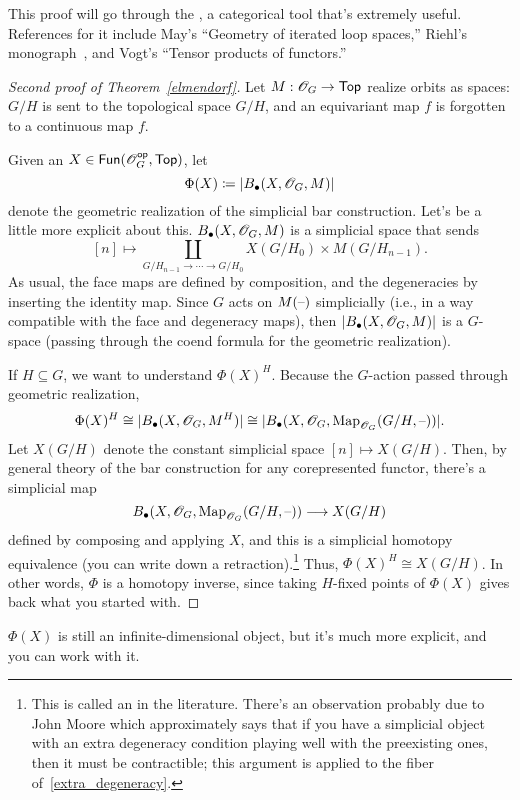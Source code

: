 This proof will go through the , a categorical tool that's extremely useful. References for
it include May's ``Geometry of iterated loop spaces,'' Riehl's monograph~\cite{RiehlCHT}, and Vogt's ``Tensor
products of functors.''
\begin{proof}[Second proof of Theorem~\ref{elmendorf}]
Let $M:\mathscr O_G\to\mathsf{Top}$ realize orbits as spaces: $G/H$ is sent to the topological space $G/H$, and an equivariant map
$f$ is forgotten to a continuous map $f$.

Given an $X\in\mathsf{Fun}(\mathscr O_G^{\mathsf{op}}, \mathsf{Top})$, let
\[\Phi(X) \coloneqq \lvert B_\bullet(X, \mathscr O_G, M)\rvert\]
denote the geometric realization of the simplicial bar construction. Let's be a little more explicit about this.
$B_\bullet(X, \mathscr O_G, M)$ is a simplicial space that sends
\[[n]\mapsto \coprod_{G/H_{n-1}\to\dotsb\to G/H_0} X(G/H_0)\times M(G/H_{n-1}).\]
As usual, the face maps are defined by composition, and the degeneracies by inserting the identity map. Since $G$
acts on $M(\text{--})$ simplicially (i.e., in a way compatible with the face and degeneracy maps), then
$\lvert B_\bullet(X, \mathscr O_G, M)\rvert$ is a $G$-space (passing through the coend formula for the geometric realization).

If $H\subseteq G$, we want to understand $\Phi(X)^H$. Because the $G$-action passed through geometric realization,
\[\Phi(X)^H\cong \lvert B_\bullet(X, \mathscr O_G, M^H)\rvert\cong \lvert B_\bullet(X, \mathscr O_G, \operatorname{Map}_{\mathscr O_G}(G/H, \text{--}))\rvert.\]
Let $X(G/H)$ denote the constant simplicial space $[n]\mapsto X(G/H)$. Then, by general theory of the bar
construction for any corepresented functor, there's a simplicial map
\begin{equation}
\label{extra_degeneracy}
B_\bullet(X, \mathscr O_G, \operatorname{Map}_{\mathscr O_G}(G/H, \text{--}))\longrightarrow X(G/H)
\end{equation}
defined by composing and applying $X$, and this is a simplicial homotopy equivalence (you can write down a
retraction).\footnote{This is called an  in the literature. There's an observation
probably due to John Moore which approximately says that if you have a simplicial object with an extra degeneracy
condition playing well with the preexisting ones, then it must be contractible; this argument is applied to the
fiber of~\eqref{extra_degeneracy}.} Thus, $\Phi(X)^H\cong X(G/H)$. In other words, $\Phi$ is a homotopy inverse,
since taking $H$-fixed points of $\Phi(X)$ gives back what you started with.
\end{proof}
$\Phi(X)$ is still an infinite-dimensional object, but it's much more explicit, and you can work with it.
